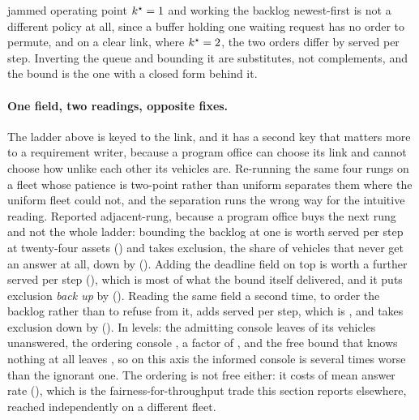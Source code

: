 \documentclass[11pt]{article}
\begin{document}
jammed operating point $k^{\star} = 1{}$ and working the backlog newest-first is not a different policy at all, since a buffer holding one waiting request has no order to permute, and on a clear link, where $k^{\star} = 2{}$, the two orders differ by \QcapDiscClearDiff{} served per step. Inverting the queue and bounding it are substitutes, not complements, and the bound is the one with a closed form behind it.

\paragraph{One field, two readings, opposite fixes.} The ladder above is keyed to the link, and it has a second key that matters more to a requirement writer, because a program office can choose its link and cannot choose how unlike each other its vehicles are. Re-running the same four rungs on a fleet whose patience is two-point rather than uniform separates them where the uniform fleet could not, and the separation runs the wrong way for the intuitive reading. Reported adjacent-rung, because a program office buys the next rung and not the whole ladder: bounding the backlog at one is worth \LdMSrvBoundTwentyFour{} served per step at twenty-four assets (\LdMSrvBoundTwentyFourV{}) and takes exclusion, the share of vehicles that never get an answer at all, down by \LdMStarveBoundTwentyFour{} (\LdMStarveBoundTwentyFourV{}). Adding the deadline field on top is worth a further \LdMSrvFieldTwentyFour{} served per step (\LdMSrvFieldTwentyFourV{}), which is most of what the bound itself delivered, and it puts exclusion \emph{back up} by \LdMStarveFieldTwentyFour{} (\LdMStarveFieldTwentyFourV{}). Reading the same field a second time, to order the backlog rather than to refuse from it, adds \LdMSrvOrderTwentyFour{} served per step, which is \LdMSrvOrderTwentyFourV{}, and takes exclusion down by \LdMStarveOrderTwentyFour{} (\LdMStarveOrderTwentyFourV{}). In levels: the admitting console leaves \LdMExclField{} of its vehicles unanswered, the ordering console \LdMExclOrder{}, a factor of \LdMExclRatio{}, and the free bound that knows nothing at all leaves \LdMExclBound{}, so on this axis the informed console is several times worse than the ignorant one. The ordering is not free either: it costs \LdMRateOrderTwentyFour{} of mean answer rate (\LdMRateOrderTwentyFourV{}), which is the fairness-for-throughput trade this section reports elsewhere, reached independently on a different fleet.
\end{document}
